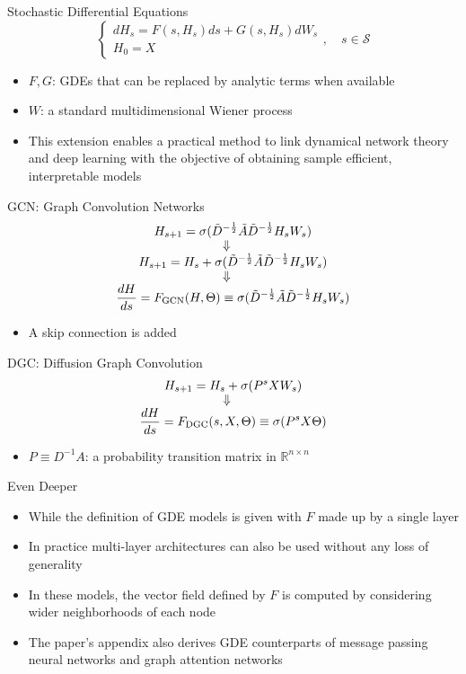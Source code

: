 \documentclass{beamer}
\begin{document}
\begin{frame}{Stochastic Differential Equations}
\[
\begin{cases}
dH_{s}=F(s,H_s)ds+G(s,H_s)dW_s\\
H_0=X
\end{cases},\quad s\in\mathbb{\mathcal{S}}
\]
\begin{itemize}
\item $F,G$: GDEs that can be replaced by analytic terms when available
\item $W$: a standard multidimensional Wiener process
\item This extension enables a practical method to link dynamical network theory and deep learning with the objective of obtaining sample efficient, interpretable models
\end{itemize}
\end{frame}

\begin{frame}{GCN: Graph Convolution Networks}
\begin{gather*}
H_{s+1}=\sigma(\tilde{D}^{-\frac{1}{2}}\tilde{A}\tilde{D}^{-\frac{1}{2}}H_sW_s)\\
\ArrowBetweenLines[\Downarrow]
H_{s+1}=H_s+\sigma(\tilde{D}^{-\frac{1}{2}}\tilde{A}\tilde{D}^{-\frac{1}{2}}H_sW_s)\\
\ArrowBetweenLines[\Downarrow]
\frac{dH}{ds}=F_\text{GCN}(H,\Theta)\equiv\sigma(\tilde{D}^{-\frac{1}{2}}\tilde{A}\tilde{D}^{-\frac{1}{2}}H_sW_s)
\end{gather*}
\begin{itemize}
\item A skip connection is added
\end{itemize}
\end{frame}

\begin{frame}{DGC: Diffusion Graph Convolution}
\begin{gather*}
H_{s+1}=H_s+\sigma(P^sXW_s)\\
\ArrowBetweenLines[\Downarrow]
\frac{dH}{ds}=F_\text{DGC}(s,X,\Theta)\equiv\sigma(P^sX\Theta)
\end{gather*}
\begin{itemize}
\item $P\equiv D^{-1}A$: a probability transition matrix in $\mathbb{R}^{n\times n}$
\end{itemize}
\end{frame}

\begin{frame}{Even Deeper}
\begin{itemize}
\item While the definition of GDE models is given with $F$ made up by a single layer
\item In practice multi-layer architectures can also be used without any loss of generality
\item In these models, the vector field defined by $F$ is computed by considering wider neighborhoods of each node
\item The paper's appendix also derives GDE counterparts of message passing neural networks and graph attention networks
\end{itemize}
\end{frame}
\end{document}
